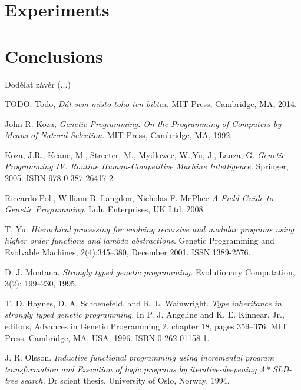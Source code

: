 \documentclass[conference]{IEEEtran}
\begin{document}
\section{Experiments}
\label{experiments}




\section{Conclusions}

Dodělat závěr (...)


\begin{thebibliography}{22}

  TODO. Todo,
  \emph{Dát sem místo toho ten bibtex}.
  MIT Press, Cambridge, MA,
  2014. 

  John R. Koza,
  \emph{Genetic Programming: On the Programming of Computers by Means of Natural Selection}.
  MIT Press, Cambridge, MA,
  1992. 

  Koza, J.R., Keane, M., Streeter, M., Mydlowec, W.,Yu, J., Lanza, G. 
  \emph{Genetic Programming IV: Routine Human-Competitive Machine Intelligence.} 
  Springer, 2005. ISBN 978-0-387-26417-2 

 Riccardo Poli, William B. Langdon, Nicholas F. McPhee
 \emph{A Field Guide to Genetic Programming}.
 Lulu Enterprises, UK Ltd, 2008.

  T. Yu. 
  \emph{Hierachical processing for evolving recursive and modular 
        programs using higher order functions and lambda abstractions}. 
  Genetic Programming and Evolvable Machines,
  2(4):345–380, December 2001. ISSN 1389-2576.


D. J. Montana. 
\emph{Strongly typed genetic programming.} 
Evolutionary Computation, 3(2): 199–230, 1995.

T. D. Haynes, D. A. Schoenefeld, and R. L. Wainwright. 
\emph{Type inheritance in strongly typed genetic programming.} 
In P. J. Angeline and K. E. Kinnear, Jr., editors, Advances
in Genetic Programming 2, chapter 18, pages 359–376.
MIT Press, Cambridge, MA, USA, 1996. ISBN 0-262-01158-1. 

J. R. Olsson. 
\emph{Inductive functional programming using incremental program 
transformation and Execution of logic programs by 
iterative-deepening A* SLD-tree search.} 
Dr scient thesis, University of Oslo, Norway, 1994.


\end{thebibliography}
\end{document}
